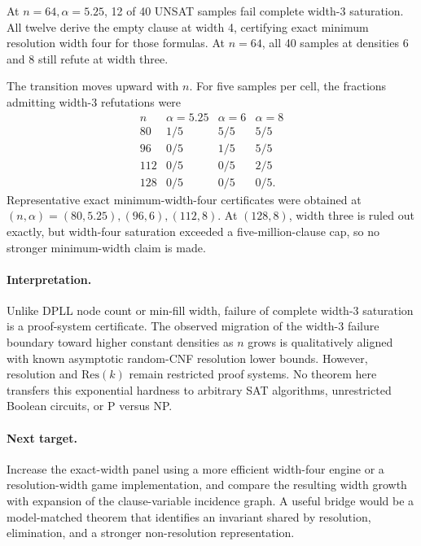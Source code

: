 At \(n=64,\alpha=5.25\), 12 of 40 UNSAT samples fail complete width-3 saturation.
All twelve derive the empty clause at width 4, certifying exact minimum resolution width
four for those formulas. At \(n=64\), all 40 samples at densities 6 and 8 still refute
at width three.

The transition moves upward with \(n\). For five samples per cell, the fractions admitting
width-3 refutations were
\[
\begin{array}{c|ccc}
n & \alpha=5.25 & \alpha=6 & \alpha=8\\
\hline
80&1/5&5/5&5/5\\
96&0/5&1/5&5/5\\
112&0/5&0/5&2/5\\
128&0/5&0/5&0/5.
\end{array}
\]
Representative exact minimum-width-four certificates were obtained at
\((n,\alpha)=(80,5.25),(96,6),(112,8)\). At \((128,8)\), width three is ruled out
exactly, but width-four saturation exceeded a five-million-clause cap, so no stronger
minimum-width claim is made.

\paragraph{Interpretation.}
Unlike DPLL node count or min-fill width, failure of complete width-3 saturation is a
proof-system certificate. The observed migration of the width-3 failure boundary toward
higher constant densities as \(n\) grows is qualitatively aligned with known asymptotic
random-CNF resolution lower bounds. However, resolution and \(\mathrm{Res}(k)\) remain
restricted proof systems. No theorem here transfers this exponential hardness to arbitrary
SAT algorithms, unrestricted Boolean circuits, or P versus NP.

\paragraph{Next target.}
Increase the exact-width panel using a more efficient width-four engine or a resolution-width
game implementation, and compare the resulting width growth with expansion of the
clause-variable incidence graph. A useful bridge would be a model-matched theorem that
identifies an invariant shared by resolution, elimination, and a stronger non-resolution
representation.

